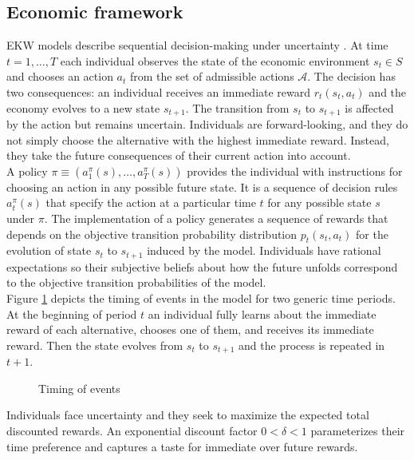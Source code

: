 \subsection{Economic framework}
EKW models describe sequential decision-making under uncertainty \citep{Gilboa.2009, Machina.2014}. At time $t = 1, \hdots, T$ each individual observes the state of the economic environment $s_t\in S$ and chooses an action $a_t$ from the set of admissible actions $\mathcal{A}$. The decision has two consequences: an individual receives an immediate reward $r_t(s_t, a_t)$ and the economy evolves to a new state $s_{t + 1}$. The transition from $s_t$ to $s_{t + 1}$ is affected by the action but remains uncertain. Individuals are forward-looking, and they do not simply choose the alternative with the highest immediate reward. Instead, they take the future consequences of their current action into account.\\

\noindent A policy $\pi \equiv(a^\pi_1(s), \hdots, a^\pi_T(s))$ provides the individual with instructions for choosing an action in any possible future state. It is a sequence of decision rules $a^\pi_t(s)$ that specify the action at a particular time $t$ for any possible state $s$ under $\pi$. The implementation of a policy generates a sequence of rewards that depends on the objective transition probability distribution $p_t(s_t, a_t)$ for the evolution of state $s_t$ to $s_{t + 1}$ induced by the model. Individuals have rational expectations \citep{Lucas.1972, Muth.1961} so their subjective beliefs about how the future unfolds correspond to the objective transition probabilities of the model.\\

\noindent Figure \ref{Timing} depicts the timing of events in the model for two generic time periods. At the beginning of period $t$ an individual fully learns about the immediate reward of each alternative, chooses one of them, and receives its immediate reward. Then the state evolves from $s_t$ to $s_{t + 1}$ and the process is repeated in $t + 1$.
%
\begin{figure}\caption{Timing of events}\label{Timing}\vspace{1.0cm}\centering

\end{figure}
%
\noindent Individuals face uncertainty and they seek to maximize the expected total discounted rewards. An exponential discount factor $0 < \delta < 1$ parameterizes their time preference and captures a taste for immediate over future rewards.\\

